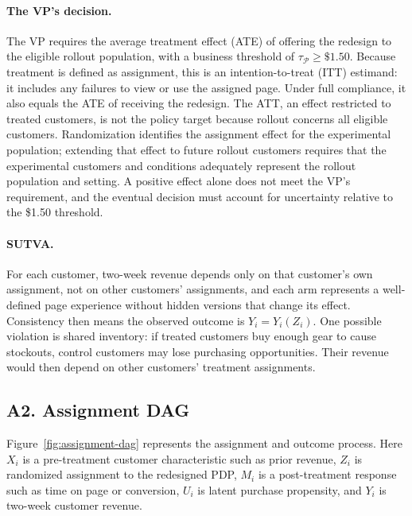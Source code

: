 \documentclass[11pt]{article}
\begin{document}
\paragraph{The VP's decision.}
The VP requires the average treatment effect (ATE) of offering the redesign
to the eligible rollout population, with a business threshold of
$\tau_{\mathcal{P}}\geq\$1.50$. Because treatment is defined as assignment,
this is an intention-to-treat (ITT) estimand: it includes any failures to
view or use the assigned page. Under full compliance, it also equals the
ATE of receiving the redesign. The ATT, an effect restricted to treated
customers, is not the policy target because rollout concerns all eligible
customers. Randomization identifies the assignment effect for the
experimental population; extending that effect to future rollout customers
requires that the experimental customers and conditions adequately represent
the rollout population and setting. A positive effect alone does not meet
the VP's requirement, and the eventual decision must account for uncertainty
relative to the \$1.50 threshold.

\paragraph{SUTVA.}
For each customer, two-week revenue depends only on that customer's own
assignment, not on other customers' assignments, and each arm represents a
well-defined page experience without hidden versions that change its effect.
Consistency then means the observed outcome is $Y_i=Y_i(Z_i)$. One possible
violation is shared inventory: if treated customers buy enough gear to cause
stockouts, control customers may lose purchasing opportunities. Their revenue
would then depend on other customers' treatment assignments.

\subsection*{A2. Assignment DAG}

Figure~\ref{fig:assignment-dag} represents the assignment and outcome process.
Here $X_i$ is a pre-treatment customer characteristic such as prior revenue,
$Z_i$ is randomized assignment to the redesigned PDP, $M_i$ is a
post-treatment response such as time on page or conversion, $U_i$ is latent
purchase propensity, and $Y_i$ is two-week customer revenue.
\end{document}
